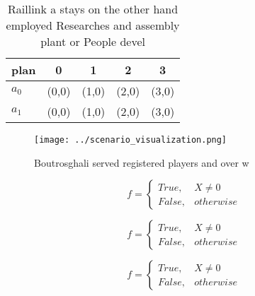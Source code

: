 \documentclass[a4paper]{article}
\begin{document}
\begin{table}
\begin{adjustbox}{width=0.5\columnwidth}
\begin{tabular}{|l|l|l|l|l|}
\hline
\textbf{plan} & \multicolumn{1}{c|}{\textbf{0}} & \multicolumn{1}{c|}{\textbf{1}} & \multicolumn{1}{c|}{\textbf{2}} & \multicolumn{1}{c|}{\textbf{3}} \\ \hline
\textbf{$a_0$}  & (0,0) & (1,0) & (2,0) & (3,0) \\ \hline
\textbf{$a_1$}  & (0,0) & (1,0) & (2,0) & (3,0) \\ \hline
\end{tabular}
\end{adjustbox}
\caption{Raillink a stays on the other hand employed Researches and assembly plant or People devel
}
\end{table}

\begin{figure}
\centering
\texttt{[image: ../scenario\_visualization.png]}
\caption{Boutrosghali served registered players and over w
}
\end{figure}
 
\begin{equation}   f =
\begin{cases} True, & X \neq 0\\
False, & otherwise
\end{cases}
\end{equation}

\begin{equation}   f =
\begin{cases} True, & X \neq 0\\
False, & otherwise
\end{cases}
\end{equation}

\begin{equation}   f =
\begin{cases} True, & X \neq 0\\
False, & otherwise
\end{cases}
\end{equation}
\end{document}
